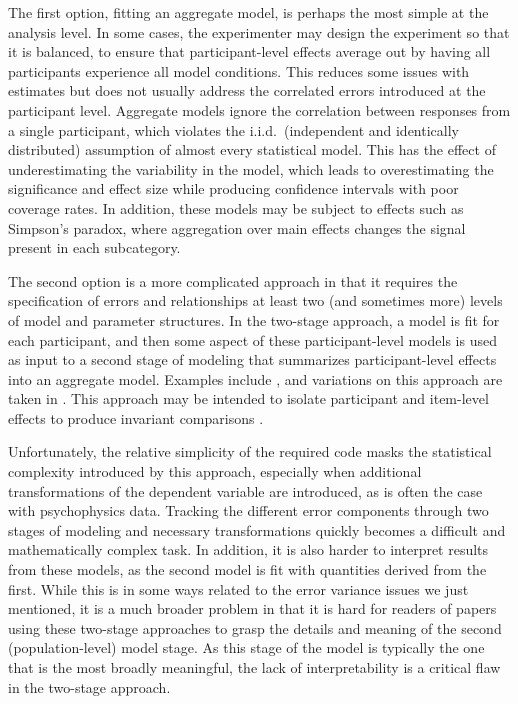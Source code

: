 The first option, fitting an aggregate model, is perhaps the most simple at the analysis level. 
In some cases, the experimenter may design the experiment so that it is balanced, to ensure that participant-level effects average out by having all participants experience all model conditions. 
This reduces some issues with estimates but does not usually address the correlated errors introduced at the participant level. 
Aggregate models ignore the correlation between responses from a single participant, which violates the i.i.d.\ (independent and identically distributed) assumption of almost every statistical model. 
This has the effect of underestimating the variability in the model, which leads to overestimating the significance and effect size while producing confidence intervals with poor coverage rates. 
In addition, these models may be subject to effects such as Simpson's paradox\cite{alin_simpsons_2010}, where aggregation over main effects changes the signal present in each subcategory.

The second option is a more complicated approach in that it requires the specification of errors and relationships at least two (and sometimes more) levels of model and parameter structures.
In the two-stage approach, a model is fit for each participant, and then some aspect of these participant-level models is used as input to a second stage of modeling that summarizes participant-level effects into an aggregate model. 
Examples include \cite{rensinkPerceptionCorrelationScatterplots2010a,harrisonRankingVisualizationsCorrelation2014,beechamMapLineUpsEffects2017,nogueira_effect_2021,hogan_trichromatic_2018,maselli_sense_2016,koelewijn_effects_2021}, and variations on this approach are taken in \cite{hughes_just_2001}. 
This approach may be intended to isolate participant and item-level effects to produce invariant comparisons \cite{rasch_probabilistic_1960}.

Unfortunately, the relative simplicity of the required code masks the statistical complexity introduced by this approach, especially when additional transformations of the dependent variable are introduced, as is often the case with psychophysics data. 
Tracking the different error components through two stages of modeling and necessary transformations quickly becomes a difficult and mathematically complex task. 
In addition, it is also harder to interpret results from these models, as the second model is fit with quantities derived from the first. 
While this is in some ways related to the error variance issues we just mentioned, it is a much broader problem in that it is hard for readers of papers using these two-stage approaches to grasp the details and meaning of the second (population-level) model stage. 
As this stage of the model is typically the one that is the most broadly meaningful, the lack of interpretability is a critical flaw in the two-stage approach.


